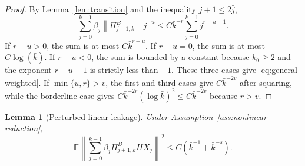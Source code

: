 \documentclass{article}
\newtheorem{lemma}[theorem]{Lemma}
\newcommand{\E}{\mathbb{E}}
\newcommand{\norm}[1]{\left\lVert #1\right\rVert}
\begin{document}
\begin{proof}
By Lemma~\ref{lem:transition} and the inequality $\overline{j+1}\le2\bar j$,
\[
  \sum_{j=0}^{k-1}\beta_j\norm{\Pi^B_{j+1,k}}\bar j^{-u}
  \le C\bar k^{-r}\sum_{j=0}^{k-1}\bar j^{r-u-1}.
\]
If $r-u>0$, the sum is at most $C\bar k^{r-u}$. If $r-u=0$, the sum is at most $C\log(\bar k)$. If $r-u<0$, the sum is bounded by a constant because $k_0\ge2$ and the exponent $r-u-1$ is strictly less than $-1$. These three cases give \eqref{eq:general-weighted}. If $\min\{u,r\}>v$, the first and third cases give $C\bar k^{-2v}$ after squaring, while the borderline case gives $C\bar k^{-2r}(\log \bar k)^2\le C\bar k^{-2v}$ because $r>v$.
\end{proof}

\begin{lemma}[Perturbed linear leakage]\label{lem:perturbed-leakage}
Under Assumption~\ref{ass:nonlinear-reduction},
\begin{equation}
  \E\left\|\sum_{j=0}^{k-1}\beta_j\Pi^B_{j+1,k}HX_j\right\|^2
  \le C\left(\bar k^{-1}+\bar k^{-s}\right). \label{eq:perturbed-leakage-bound}
\end{equation}
\end{lemma}
\end{document}
